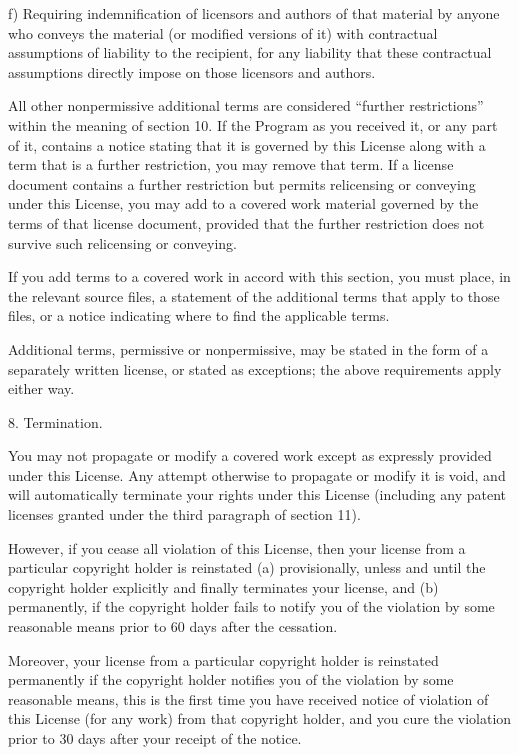 \documentclass[letterpaper,10pt,english]{sphinxmanual}
\begin{document}
\begin{sphinxVerbatim}[commandchars=\\\{\}]
    f) Requiring indemnification of licensors and authors of that material by
       anyone who conveys the material (or modified versions of it) with
       contractual assumptions of liability to the recipient, for any liability
       that these contractual assumptions directly impose on those licensors
       and authors.

    All other non\PYGZhy{}permissive additional terms are considered “further
    restrictions” within the meaning of section 10. If the Program as you
    received it, or any part of it, contains a notice stating that it is
    governed by this License along with a term that is a further restriction,
    you may remove that term. If a license document contains a further
    restriction but permits relicensing or conveying under this License, you
    may add to a covered work material governed by the terms of that license
    document, provided that the further restriction does not survive such
    relicensing or conveying.

    If you add terms to a covered work in accord with this section, you must
    place, in the relevant source files, a statement of the additional terms
    that apply to those files, or a notice indicating where to find the
    applicable terms.

    Additional terms, permissive or non\PYGZhy{}permissive, may be stated in the form
    of a separately written license, or stated as exceptions; the above
    requirements apply either way.

 8. Termination.

    You may not propagate or modify a covered work except as expressly provided
    under this License. Any attempt otherwise to propagate or modify it is
    void, and will automatically terminate your rights under this License
    (including any patent licenses granted under the third paragraph of section
    11).

    However, if you cease all violation of this License, then your license from
    a particular copyright holder is reinstated (a) provisionally, unless and
    until the copyright holder explicitly and finally terminates your license,
    and (b) permanently, if the copyright holder fails to notify you of the
    violation by some reasonable means prior to 60 days after the cessation.

    Moreover, your license from a particular copyright holder is reinstated
    permanently if the copyright holder notifies you of the violation by some
    reasonable means, this is the first time you have received notice of
    violation of this License (for any work) from that copyright holder, and
    you cure the violation prior to 30 days after your receipt of the notice.


\end{sphinxVerbatim}
\end{document}
